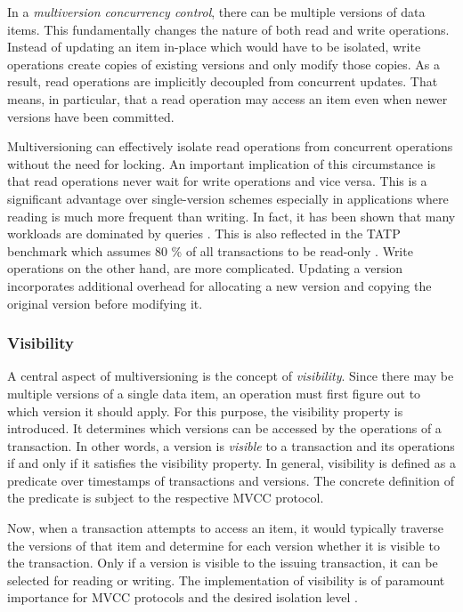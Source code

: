 In a \emph{multiversion concurrency control}, there can be multiple versions of
data items. This fundamentally changes the nature of both read and write
operations. Instead of updating an item in-place which would have to be
isolated, write operations create copies of existing versions and only modify
those copies. As a result, read operations are implicitly decoupled from
concurrent updates. That means, in particular, that a read operation may access
an item even when newer versions have been committed.


Multiversioning can effectively isolate read operations from concurrent
operations without the need for locking. An important implication of this
circumstance is that read operations never wait for write operations and vice
versa. This is a significant advantage over single-version schemes especially in
applications where reading is much more frequent than writing. In fact, it has
been shown that many workloads are dominated by queries \cite{krueger2011fast,
andrei2017sap}. This is also reflected in the TATP benchmark which assumes 80 \%
of all transactions to be read-only \cite{larson2011high}. Write operations on
the other hand, are more complicated. Updating a version incorporates additional
overhead for allocating a new version and copying the original version before
modifying it.

\subsubsection{Visibility}

A central aspect of multiversioning is the concept of \emph{visibility}. Since
there may be multiple versions of a single data item, an operation must first
figure out to which version it should apply. For this purpose, the visibility
property is introduced. It determines which versions can be accessed by the
operations of a transaction. In other words, a version is \emph{visible} to a
transaction and its operations if and only if it satisfies the visibility
property. In general, visibility is defined as a predicate over timestamps of
transactions and versions. The concrete definition of the predicate is subject
to the respective MVCC protocol.

Now, when a transaction attempts to access an item, it would typically traverse
the versions of that item and determine for each version whether it is visible
to the transaction. Only if a version is visible to the issuing transaction, it
can be selected for reading or writing. The implementation of visibility is of
paramount importance for MVCC protocols and the desired isolation level
\cite{larson2011high}.

